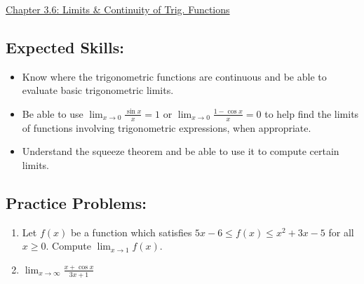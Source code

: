 \documentclass[12pt]{article}
\newif\ifans
\begin{document}
\begin{center}
\underline{\LARGE{Chapter 3.6: Limits \& Continuity of Trig. Functions}}
\end{center}

\subsection*{Expected Skills:}

\begin{itemize}

\item Know where the trigonometric functions are continuous and be able to evaluate basic trigonometric limits.

\item Be able to use $\lim_{x\rightarrow0}\frac{\sin{x}}{x}=1$ or $\lim_{x \rightarrow 0}\frac{1-\cos{x}}{x}=0$ to help find the limits of functions involving trigonometric expressions, when appropriate.

\item Understand the squeeze theorem and be able to use it to compute certain limits.

\end{itemize}

\subsection*{Practice Problems: }


\begin{enumerate}

\item Let $f(x)$ be a function which satisfies $\displaystyle 5x-6 \leq f(x) \leq x^2+3x-5$ for all $x \geq 0$.  Compute $\displaystyle \lim_{x \rightarrow 1}{f(x)}$.

\ifans{\fbox{$-1$}} \fi

\item $\lim_{x\to\infty} \frac{x+\cos{x}}{3x+1}$

\ifans{\fbox{\parbox{1\linewidth}{Notice that $f(x)=\frac{x+\cos{x}}{3x+1}$ can be bounded as follows: $$\frac{x-1}{3x+1} \leq \frac{x+\cos{x}}{3x+1} \leq \frac{x+1}{3x+1}$$  Since $\lim_{x\to\infty} \frac{x-1}{3x+1}= \frac{x+1}{3x+1}=\frac{1}{3}$, it follows that $\lim_{x\to\infty}  \frac{x+\cos{x}}{3x+1}=\frac{1}{3}$.}}} \fi

\end{enumerate}
\end{document}
